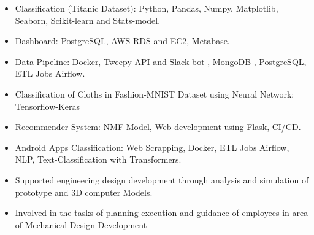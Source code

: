 \documentclass[10pt,a4paper,ragged2e,withhyper]{altacv}
\begin{document}
\begin{paracol}{2}
\begin{itemize}
\item Classification (Titanic Dataset): Python, Pandas, Numpy, Matplotlib, Seaborn, Scikit-learn and Stats-model.
\item Dashboard: PostgreSQL, AWS RDS and  EC2, Metabase.
\item Data Pipeline: Docker, Tweepy API and Slack bot , MongoDB , PostgreSQL, ETL Jobs Airflow.
\item Classification of Cloths in Fashion-MNIST Dataset using Neural Network: Tensorflow-Keras
\item Recommender System: NMF-Model, Web development using Flask, CI/CD.
\item Android Apps Classification: Web Scrapping, Docker, ETL Jobs Airflow, NLP, Text-Classification with Transformers.
\end{itemize}

\divider

\begin{itemize}
    \item Supported engineering design development through analysis and simulation of prototype and 3D computer Models.
\item Involved in the tasks of planning execution and guidance of employees in area of Mechanical Design Development
\end{itemize}


\begin{comment}


\cvsection{A Day of My Life}

\hspace*{-1em}  %
\wheelchart{1.5cm}{0.5cm}{%
  10/13em/accent!30/Sleeping \& dreaming about work,
  25/9em/accent!60/Public resolving issues with Yahoo!\ investors,
  5/11em/accent!10/\footnotesize\\[1ex]New York \& San Francisco Ballet Jawbone board member,
  20/11em/accent!40/Spending time with family,
  5/8em/accent!20/\footnotesize Business development for Yahoo!\ after the Verizon acquisition,
  30/9em/accent/Showing Yahoo!\ \mbox{employees} that their work has meaning,
  5/8em/accent!20/Baking cupcakes
}



\end{comment}
\end{paracol}
\end{document}

